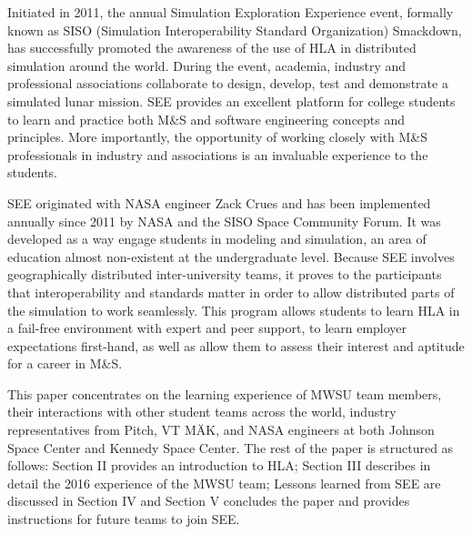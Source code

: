\documentclass[journal, onecolumn]{IEEEtran}
\begin{document}
Initiated in 2011, the annual Simulation Exploration Experience event, formally known as SISO (Simulation Interoperability Standard Organization) Smackdown, has successfully promoted the awareness of the use of HLA in distributed simulation around the world. During the event, academia, industry and professional associations collaborate to design, develop, test and demonstrate a simulated lunar mission. SEE provides an excellent platform for college students to learn and practice both M\&S and software engineering concepts and principles. More importantly, the opportunity of working closely with M\&S professionals in industry and associations is an invaluable experience to the students. 

SEE originated with NASA engineer Zack Crues and has been implemented annually since 2011 by NASA and the SISO Space Community Forum.  It was developed as a way engage students in modeling and simulation, an area of education almost non-existent at the undergraduate level.  Because SEE involves geographically distributed inter-university teams, it proves to the participants that interoperability and standards matter in order to allow distributed parts of the simulation to work seamlessly. This program allows students to learn HLA in a fail-free environment with expert and peer support, to learn employer expectations first-hand, as well as allow them to assess their interest and aptitude for a career in M\&S.  

This paper concentrates on the learning experience of MWSU team members, their interactions with other student teams across the world, industry representatives from Pitch, VT M{\"A}K, and NASA engineers at both Johnson Space Center and Kennedy Space Center.  The rest of the paper is structured as follows: Section II provides an introduction to HLA; Section III describes in detail the 2016 experience of the MWSU team; Lessons learned from SEE are discussed in Section IV and Section V concludes the paper and provides instructions for future teams to join SEE.
\end{document}
